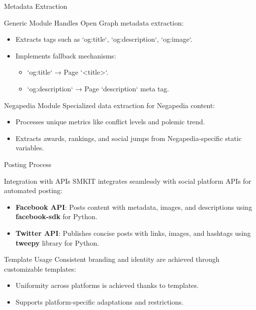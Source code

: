 \documentclass{beamer}
\begin{document}
    \begin{frame}{Metadata Extraction}
        \begin{block}{Generic Module}
            Handles Open Graph metadata extraction:
            \begin{itemize}
                \item Extracts tags such as `og:title`, `og:description`, `og:image`.
                \item Implements fallback mechanisms:
                    \begin{itemize}
                        \item `og:title` → Page `<title>`.
                        \item `og:description` → Page `description` meta tag.
                    \end{itemize}
            \end{itemize}
        \end{block}
 
        \begin{block}{Negapedia Module}
            Specialized data extraction for Negapedia content:
            \begin{itemize}
                \item Processes unique metrics like conflict levels and polemic trend.
                \item Extracts awards, rankings, and social jumps from Negapedia-specific static variables.
            \end{itemize}
        \end{block}
    \end{frame}

    \begin{frame}{Posting Process}
        \begin{block}{Integration with APIs}
            SMKIT integrates seamlessly with social platform APIs for automated posting:
            \begin{itemize}
                \item \textbf{Facebook API}: Posts content with metadata, images, and descriptions using \textbf{facebook-sdk} for Python.
                \item \textbf{Twitter API}: Publishes concise posts with links, images, and hashtags using \textbf{tweepy} library  for Python.
            \end{itemize}
        \end{block}
    
        \begin{block}{Template Usage}
            Consistent branding and identity are achieved through customizable templates:
            \begin{itemize}
                \item Uniformity across platforms is achieved thanks to templates.
                \item Supports platform-specific adaptations and restrictions.
            \end{itemize}
        \end{block}
    \end{frame}
\end{document}
